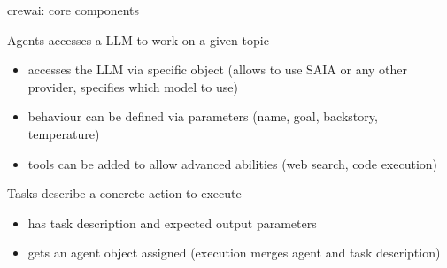 \documentclass[t,
10pt,
handout, %
]{beamer}
\numberwithin{equation}{section}
\begin{document}
	\begin{frame}[b]{crewai: core components}
		\begin{block}{Agents\autocite{agentPy}}
			accesses a LLM to work on a given topic
			\pause
			\begin{itemize}
				\item accesses the LLM via specific object (allows to use SAIA or any other provider, specifies which model to use)
				\item behaviour can be defined via parameters (name, goal, backstory, temperature)
				\item tools can be added to allow advanced abilities (web search, code execution)
			\end{itemize}
		\end{block}
		\pause
		\begin{block}{Tasks\autocite{taskPy}}
			describe a concrete action to execute
			\pause
			\begin{itemize}
				\item has task description and expected output parameters
				\item gets an agent object assigned (execution merges agent and task description)
			\end{itemize}
		\end{block}
	\end{frame}
\end{document}
